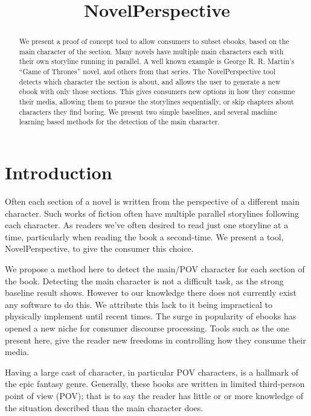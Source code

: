 \documentclass[11pt,a4paper]{article}
\title{NovelPerspective}
\begin{document}
\maketitle

\begin{abstract}
We present a proof of concept tool to allow consumers to subset ebooks, based on the main character of the section.
Many novels have multiple main characters each with their own storyline running in parallel.
A well known example is George R. R. Martin's ``Game of Thrones'' novel, and others from that series.
The NovelPerspective tool detects which character the section is about,
and allows the user to generate a new ebook with only those sections.
This gives consumers new options in how they consume their media, allowing them to  pursue the storylines sequentially, or skip chapters about characters they find boring.
We present two simple baselines, and several machine learning based methods for the detection of the main character.
\end{abstract}

\section{Introduction}
Often each section of a novel is written  from the perspective of a different main character.
Such works of fiction often have multiple parallel storylines following each character.
As readers we've often desired to read just one storyline at a time, particularly when reading the book a second-time.
We present a tool, NovelPerspective, to give the consumer this choice.

We propose a method here to detect the main/POV character for each section of the book.
Detecting the main character is not a difficult task, as the strong baseline result shows.
However to our knowledge there does not currently exist any  software to do this.
We attribute this lack to it being impractical to physically implement until recent times.
The surge in popularity of ebooks has opened a new niche for consumer discourse processing.
Tools such as the one present here, give the reader new freedoms in controlling how they consume their media.



Having a large cast of character, in particular POV characters, is a hallmark of the epic fantasy genre.
Generally, these books are written in limited third-person point of view (POV);
that is to say the reader has little or or more knowledge of the situation described than the main character does.
\end{document}
